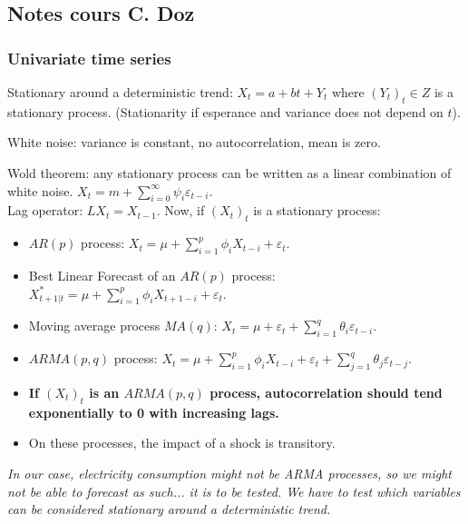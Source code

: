 \subsection{Notes cours C. Doz}

\subsubsection{Univariate time series}
Stationary around a deterministic trend: $X_t = a + bt + Y_t$ where $(Y_t)_t \in Z$ is a stationary process. (Stationarity if esperance and variance does not depend on $t$).

White noise: variance is constant, no autocorrelation, mean is zero.

Wold theorem: any stationary process can be written as a linear combination of white noise. $X_t = m + \sum_{i=0}^{\infty} \psi_i \varepsilon_{t-i}$. \\


Lag operator: $LX_t = X_{t-1}$. Now, if $(X_t)_t$ is a stationary process:
\begin{itemize}
    \item $AR(p)$ process: $X_t = \mu + \sum_{i=1}^{p} \phi_i X_{t-i} + \varepsilon_t$.
    \item Best Linear Forecast of an $AR(p)$ process: $X^*_{t+1\vert t} = \mu + \sum_{i=1}^{p} \phi_i X_{t+1-i} + \varepsilon_t$.
    \item Moving average process $MA(q)$: $X_t = \mu + \varepsilon_t + \sum_{i=1}^{q} \theta_i \varepsilon_{t-i}$.
    \item $ARMA(p, q)$ process: $X_t = \mu + \sum_{i=1}^{p} \phi_i X_{t-i} + \varepsilon_t + \sum_{j=1}^{q} \theta_j \varepsilon_{t-j}$.
    \item \textbf{If $(X_t)_t$ is an $ARMA(p, q)$ process, autocorrelation should tend exponentially to 0 with increasing lags.}
    \item On these processes, the impact of a shock is transitory.
\end{itemize}

\textit{In our case, electricity consumption might not be ARMA processes, so we might not be able to forecast as such... it is to be tested. We have to test which variables can be considered stationary around a deterministic trend.}


